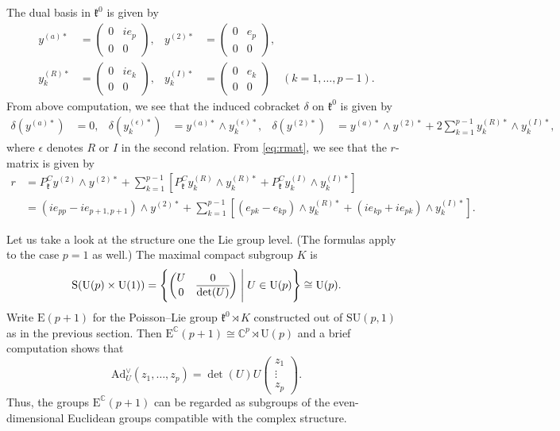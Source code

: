 \documentclass[a4paper,11pt]{amsart}
\newcommand{\C}{\mathbb C}
\newcommand{\fr}[1]{\mathfrak{#1}}
\newcommand{\ol}[1]{\overline{#1}}
\newcommand{\Ad}{\mathrm{Ad}}
\newcommand{\SU}{\mathrm{SU}}
\newcommand{\rE}{\mathrm{E}}
\theoremstyle{definition}
\theoremstyle{remark}
\begin{document}
The dual basis in $\fr k^0$ is given by
\begin{align*}
y^{(a)\ast} &= \begin{pmatrix}
 0 & i e_p \\ 0 & 0 
\end{pmatrix}
 , &
y^{(2)\ast} &= \begin{pmatrix}
 0 & e_p \\ 0 & 0 
\end{pmatrix}
 , \\
y^{(R)\ast}_k &= \begin{pmatrix}
 0 & i e_k \\ 0 & 0 
\end{pmatrix}
 , &
y^{(I)\ast}_k &= \begin{pmatrix}
 0 & e_k \\ 0 & 0 
\end{pmatrix}
 \quad (k = 1 , \dots , p -1).
\end{align*}
From above computation, we see that the induced cobracket $\delta$ on $\fr{k}^0$ is given by
\begin{align*}
\delta\mathopen{}\left( y^{(a)\ast} \right) &= 0 , &
\delta\mathopen{}\left( y^{(\epsilon)\ast}_k \right) &= y^{(a)\ast} \wedge y^{(\epsilon)\ast}_k , &
\delta\mathopen{}\left( y^{(2)\ast} \right) &= y^{(a)\ast} \wedge y^{(2)\ast} + 2 \sum_{k=1}^{p-1} y^{(R)\ast}_k \wedge y^{(I)\ast}_k,
\end{align*}
where $\epsilon$ denotes $R$ or $I$ in the second relation.
From \eqref{eq:rmat}, we see that the $r$-matrix is given by
\[
\begin{split}
r &= P^C_{\fr k} y^{(2)} \wedge y^{(2)\ast} + \sum_{k=1}^{p-1} \left[ P^C_{\fr k} y^{(R)}_k \wedge y^{(R)\ast}_k + P^C_{\fr k} y^{(I)}_k \wedge y^{(I)\ast}_k \right] \\
&= \left( i e_{pp} - i e_{p+1,p+1} \right) \wedge y^{(2)\ast} + \sum_{k=1}^{p-1} \left[ ( e_{pk} - e_{kp} ) \wedge y^{(R)\ast}_k + ( i e_{kp} + i e_{pk} ) \wedge y^{(I)\ast}_k \right] .
\end{split}
\]

Let us take a look at the structure one the Lie group level.
(The formulas apply to the case $p = 1$ as well.)
The maximal compact subgroup $K$ is
\[
\mathrm{S} ( \mathrm{U}(p) \times \mathrm{U}(1) ) = \left\{ 
\begin{pmatrix}
U & 0 \\ 0 & \ol{\det(U)}
\end{pmatrix}
\Biggm| U \in \mathrm{U}(p) \right\} \cong \mathrm{U}(p) .
\]
Write $\rE(p+1)$ for the Poisson--Lie group $\fr k^0 \rtimes K$ constructed out of $\SU(p,1)$ as in the previous section.
Then $\rE^\C(p+1) \cong \C^p \rtimes \mathrm{U}(p)$ and a brief computation shows that
\[
\Ad^\vee_U (z_1,\dots,z_p) = \det(U) U \begin{pmatrix}
z_1 \\ \vdots \\ z_p 
\end{pmatrix}
.
\]
Thus, the groups $\rE^\C(p+1)$ can be regarded as subgroups of the even-dimensional Euclidean groups compatible with the complex structure.
\end{document}
